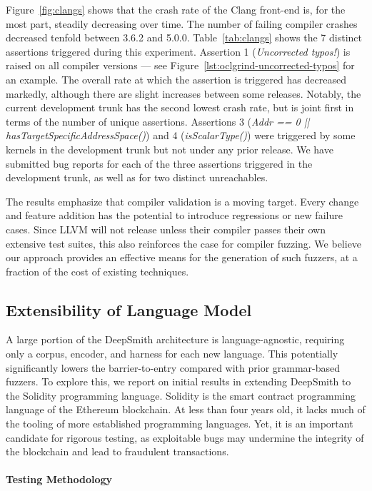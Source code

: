 Figure~\ref{fig:clangs} shows that the crash rate of the Clang front-end is, for
the most part, steadily decreasing over time. The number of failing compiler
crashes decreased tenfold between 3.6.2 and 5.0.0. Table~\ref{tab:clangs} shows
the 7 distinct assertions triggered during this experiment. Assertion 1
(\emph{Uncorrected typos!}) is raised on all compiler versions --- see
Figure~\ref{lst:oclgrind-uncorrected-typos} for an example. The overall rate at
which the assertion is triggered has decreased markedly, although there are
slight increases between some releases. Notably, the current development trunk
has the second lowest crash rate, but is joint first in terms of the number of
unique assertions. Assertions 3 (\emph{Addr == 0 ||
hasTargetSpecificAddressSpace()}) and 4 (\emph{isScalarType()}) were triggered
by some kernels in the development trunk but not under any prior release. We
have submitted bug reports for each of the three assertions triggered in the
development trunk, as well as for two distinct unreachables.

The results emphasize that compiler validation is a moving target. Every change
and feature addition has the potential to introduce regressions or new failure
cases. Since LLVM will not release unless their compiler passes their own
extensive test suites, this also reinforces the case for compiler fuzzing. We
believe our approach provides an effective means for the generation of such
fuzzers, at a fraction of the cost of existing techniques.


\subsection{Extensibility of Language Model}

A large portion of the DeepSmith architecture is language-agnostic, requiring
only a corpus, encoder, and harness for each new language. This potentially
significantly lowers the barrier-to-entry compared with prior grammar-based
fuzzers. To explore this, we report on initial results in extending DeepSmith to
the Solidity programming language. Solidity is the smart contract programming
language of the Ethereum blockchain. At less than four years old, it lacks much
of the tooling of more established programming languages. Yet, it is an
important candidate for rigorous testing, as exploitable bugs may undermine the
integrity of the blockchain and lead to fraudulent transactions.

\paragraph{Testing Methodology}

